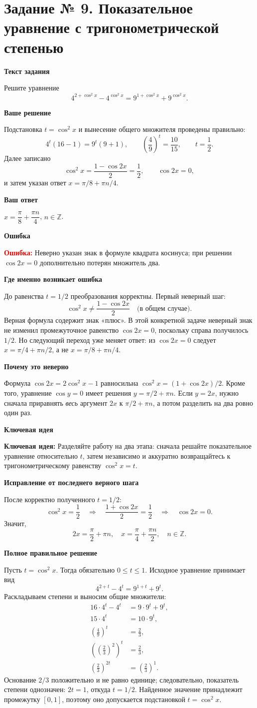 \documentclass[12pt,a4paper]{article}
\newcommand{\heading}[1]{\par\vspace{4pt}\textbf{#1}\par}
\newcommand{\err}{\textcolor{red}{\textbf{Ошибка:}}}
\newcommand{\idea}{\textcolor{blue!60!black}{\textbf{Ключевая идея:}}}
\newcommand{\nZ}{n\in\mathbb Z}
\begin{document}
\section*{Задание № 9. Показательное уравнение с тригонометрической степенью}
\heading{Текст задания}
Решите уравнение
\[
4^{2+\cos^2x}-4^{\cos^2x}
=9^{1+\cos^2x}+9^{\cos^2x}.
\]
\heading{Ваше решение}
Подстановка $t=\cos^2x$ и вынесение общего множителя проведены правильно:
\[
4^t(16-1)=9^t(9+1),\qquad
\left(\frac49\right)^t=\frac{10}{15},
\qquad t=\frac12.
\]
Далее записано
\[
\cos^2x=\frac{1-\cos2x}{2}=\frac12,
\qquad \cos2x=0,
\]
и затем указан ответ $x=\pi/8+\pi n/4$.
\heading{Ваш ответ}
$x=\dfrac\pi8+\dfrac{\pi n}{4}$, $n\in\mathbb Z$.
\heading{Ошибка}
\err{} Неверно указан знак в формуле квадрата косинуса; при решении $\cos2x=0$ дополнительно потерян множитель два.
\heading{Где именно возникает ошибка}
До равенства $t=1/2$ преобразования корректны. Первый неверный шаг:
\[
\cos^2x\ne\frac{1-\cos2x}{2}
\quad\text{(в общем случае)}.
\]
Верная формула содержит знак «плюс». В этой конкретной задаче неверный знак не изменил промежуточное равенство $\cos2x=0$, поскольку справа получилось $1/2$. Но следующий переход уже меняет ответ: из $\cos2x=0$ следует $x=\pi/4+\pi n/2$, а не $x=\pi/8+\pi n/4$.
\heading{Почему это неверно}
Формула $\cos2x=2\cos^2x-1$ равносильна $\cos^2x=(1+\cos2x)/2$. Кроме того, уравнение $\cos y=0$ имеет решения $y=\pi/2+\pi n$. Если $y=2x$, нужно сначала приравнять \emph{весь} аргумент $2x$ к $\pi/2+\pi n$, а потом разделить на два ровно один раз.
\heading{Ключевая идея}
\idea{} Разделяйте работу на два этапа: сначала решайте показательное уравнение относительно $t$, затем независимо и аккуратно возвращайтесь к тригонометрическому равенству $\cos^2x=t$.
\heading{Исправление от последнего верного шага}
После корректно полученного $t=1/2$:
\[
\cos^2x=\frac12
\quad\Longrightarrow\quad
\frac{1+\cos2x}{2}=\frac12
\quad\Longrightarrow\quad
\cos2x=0.
\]
Значит,
\[
2x=\frac\pi2+\pi n,
\quad\boxed{x=\frac\pi4+\frac{\pi n}{2}},\quad\nZ.
\]
\heading{Полное правильное решение}
Пусть $t=\cos^2x$. Тогда обязательно $0\le t\le1$. Исходное уравнение принимает вид
\[
4^{2+t}-4^t=9^{1+t}+9^t.
\]
Раскладываем степени и выносим общие множители:
\begin{align*}
16\cdot4^t-4^t&=9\cdot9^t+9^t,\\
15\cdot4^t&=10\cdot9^t,\\
\left(\frac49\right)^t&=\frac23,\\
\left(\left(\frac23\right)^2\right)^t&=\frac23,\\
\left(\frac23\right)^{2t}&=\left(\frac23\right)^1.
\end{align*}
Основание $2/3$ положительно и не равно единице; следовательно, показатель степени однозначен: $2t=1$, откуда $t=1/2$. Найденное значение принадлежит промежутку $[0,1]$, поэтому оно допускается подстановкой $t=\cos^2x$.
\end{document}
